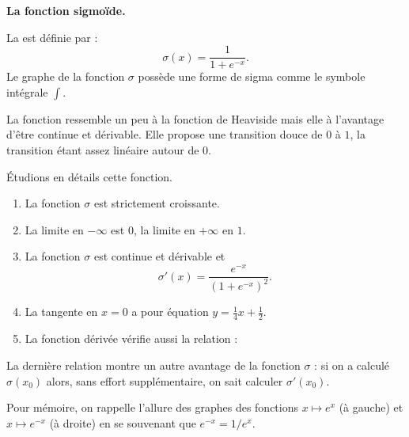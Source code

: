 \documentclass[11pt,class=report,crop=false]{standalone}
\begin{document}



\bigskip
\textbf{La fonction sigmoïde.}

La  est définie par :
$$\sigma(x) = \frac{1}{1+e^{-x}}.$$
Le graphe de la fonction $\sigma$ possède une forme de \og{}sigma\fg{} comme le symbole intégrale $\int$.



La fonction ressemble un peu à la fonction de Heaviside mais elle à l'avantage d'être continue et dérivable. Elle propose une transition douce de $0$ à $1$, la transition étant assez linéaire 
autour de $0$.

Étudions en détails cette fonction.
\begin{proposition}
\sauteligne
\begin{enumerate}
  \item La fonction $\sigma$ est strictement croissante.
  \item La limite en $-\infty$ est $0$, la limite en $+\infty$ en $1$.
  \item La fonction $\sigma$ est continue et dérivable et 
  $$\sigma'(x) = \frac{e^{-x}}{(1+e^{-x})^2}.$$
  \item La tangente en $x=0$ a pour équation $y=\frac14x+\frac12$.
  \item La fonction dérivée vérifie aussi la relation :
\end{enumerate}
\end{proposition}
La dernière relation montre un autre avantage de la fonction $\sigma$ : si on a calculé $\sigma(x_0)$ alors, sans effort supplémentaire, on sait calculer $\sigma'(x_0)$.

Pour mémoire, on rappelle l'allure des graphes des fonctions $x\mapsto e^x$ (à gauche) et $x\mapsto e^{-x}$ (à droite) en se souvenant que $e^{-x} = 1/e^x$.

\end{document}
